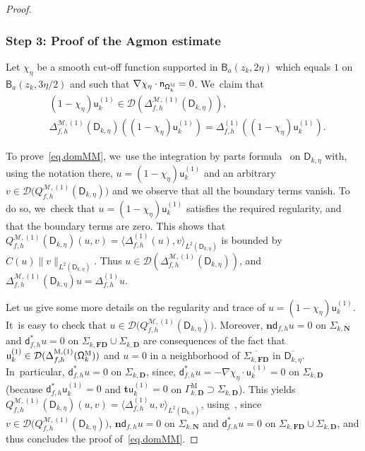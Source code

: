 \documentclass[JEP,XML,SOM,Unicode,NoEqCountersInSection,NoFloatCountersInSection,published]{cedram}
\newcommand{\ft}[1]{\mathsf{#1}}
\newcommand{\mbf}[1]{\mathbf{#1}}
\theoremstyle{plain}
\theoremstyle{definition}
\begin{document}
\begin{proof}
\subsubsection*{Step 3: Proof of the Agmon estimate}
Let $\chi_\eta$ be a smooth cut-off function supported in $\mathsf
B_{a}(z_k,2\eta)$ which equals $1$ on $\mathsf B_{a}(z_k,3\eta/2)$ and such that $
\nabla \chi_\eta \cdot \ft n_{\mathsf \Omega_k^{\textsc{M}}} =0$. We~claim that
\begin{equation}\label{eq.domMM}
\begin{aligned}
&(1-\chi_\eta)\mathsf u^{(1)}_k\in \mathcal D(\Delta_{f,h}^{
\mathcal M,(1)} (\mathsf D_{k,\eta})),\\
& \Delta_{f,h}^{ \mathcal M,(1)} (\mathsf D_{k,\eta})((1-\chi_\eta)\mathsf u^{(1)}_k) = \Delta_{f,h}^{(1)}
((1-\chi_\eta)\mathsf u^{(1)}_k).
\end{aligned}
\end{equation}

To prove~\eqref{eq.domMM}, we~use the integration
by parts formula~\cite[Eq.\,(120)]{DLLN} on $\mathsf D_{k,\eta}$ with,
using the notation there,
$u=(1-\chi_\eta) \mathsf u^{(1)}_k$ and an arbitrary $v\in \mathcal D\bigl(Q_{f,h}^{ \mathcal M,(1)} (\mathsf D_{k,\eta})\bigr)$ and we
observe that all the boundary terms vanish. To do
so, we~check that $u=(1-\chi_\eta) \mathsf u^{(1)}_k$ satisfies the
required regularity, and that the boundary terms are zero. This
shows that $Q_{f,h}^{ \mathcal M,(1)} (\mathsf D_{k,\eta})(u,v) = \langle \Delta_{f,h}^{(1)}(u),v \rangle_{L^2(\mathsf D_{k,\eta})}$ is bounded by $ C(u) \|v\|_{L^2(\mathsf D_{k,\eta})} $. Thus $u \in
\mathcal D(\Delta_{f,h}^{ \mathcal M,(1)} (\mathsf D_{k,\eta}))$, and $\Delta_{f,h}^{ \mathcal M,(1)} (\mathsf D_{k,\eta}) u
= \Delta_{f,h}^{(1)}u $.

Let us give some more details on the regularity and trace of
$u=(1-\chi_\eta) \mathsf u^{(1)}_k$. It~is easy to check that $u \in \mathcal D\bigl(Q_{f,h}^{ \mathcal M,(1)} (\mathsf D_{k,\eta})\big)$. Moreover, $\mathbf
n\mathsf d_{f,h}u=0$ on $\Sigma_{k, \mbf N}$ and $\mathsf
d^*_{f,h}u=0$ on $\Sigma_{k, \mbf {FD}}\cup \Sigma_{k, \mbf {D}}$ are
consequences of the fact that $\mathsf u^{(1)}_k\in \mathcal
D(\Delta_{f,h}^{\text{M}, (1)}(\mathsf \Omega_k^{\textsc{M}}))$ and $u=0$ in a neighborhood of $\overline{\Sigma_{k, \mbf
{FD}}}$ in $\overline{\mathsf D_{k,\eta} }$. In~particular, $\mathsf d^*_{f,h}u=0 \text{ on } \Sigma_{k, \mbf {D}}$,
since, $\mathsf d_{f,h}^*u=-\nabla \chi_\eta\cdot \mathsf
u^{(1)}_k=0$ on $\Sigma_{k, \mbf D}$ (because $\mathsf d_{f,h}^*\mathsf u^{(1)}_k=0$ and $\mathbf t\mathsf
u^{(1)}_k=0$ on $\Gamma_{k,
\mbf D}^{\text{M}}\supset \Sigma_{k, \mbf D}$). This yields
$Q_{f,h}^{ \mathcal M,(1)} (\mathsf D_{k,\eta})(u,v) = \langle \Delta_{f,h}^{(1)}u,v \rangle_{L^2(\mathsf
D_{k,\eta})}$, using~\cite[Eq.\,(120)]{DLLN}, since $v\in \mathcal D\bigl(Q_{f,h}^{ \mathcal M,(1)} (\mathsf D_{k,\eta})\bigr)$, $\mathbf
n\mathsf d_{f,h}u=0$ on $\Sigma_{k, \mbf N}$ and $\mathsf
d^*_{f,h}u=0$ on $\Sigma_{k, \mbf {FD}}\cup \Sigma_{k, \mbf {D}}$, and
thus concludes the proof of~\ref{eq.domMM}.


\end{proof}
\end{document}
